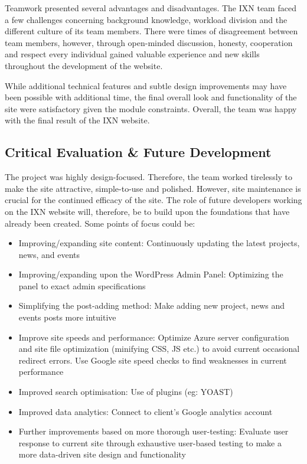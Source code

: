 Teamwork presented several advantages and disadvantages. The IXN team
faced a few challenges concerning background knowledge, workload
division and the different culture of its team members. There were times
of disagreement between team members, however, through open-minded
discussion, honesty, cooperation and respect every individual gained
valuable experience and new skills throughout the development of the
website.

While additional technical features and subtle design improvements may
have been possible with additional time, the final overall look and
functionality of the site were satisfactory given the module
constraints. Overall, the team was happy with the final result of the
IXN website.

\hypertarget{critical-evaluation-future-development}{%
\subsection{Critical Evaluation \& Future
Development}\label{critical-evaluation-future-development}}

The project was highly design-focused. Therefore, the team worked
tirelessly to make the site attractive, simple-to-use and polished.
However, site maintenance is crucial for the continued efficacy of the
site.\cite{g8} The role of future developers working on the IXN website
will, therefore, be to build upon the foundations that have already been
created. Some points of focus could be:

\begin{itemize}
\tightlist
\item
  Improving/expanding site content: Continuously updating the latest
  projects, news, and events
\item
  Improving/expanding upon the WordPress Admin Panel: Optimizing the
  panel to exact admin specifications
\item
  Simplifying the post-adding method: Make adding new project, news and
  events posts more intuitive
\item
  Improve site speeds and performance: Optimize Azure server
  configuration and site file optimization (minifying CSS, JS etc.) to
  avoid current occasional redirect errors. Use Google site speed checks
  to find weaknesses in current performance
\item
  Improved search optimisation: Use of plugins (eg: YOAST)
\item
  Improved data analytics: Connect to client's Google analytics account
\item
  Further improvements based on more thorough user-testing: Evaluate
  user response to current site through exhaustive user-based testing to
  make a more data-driven site design and functionality
\end{itemize}

